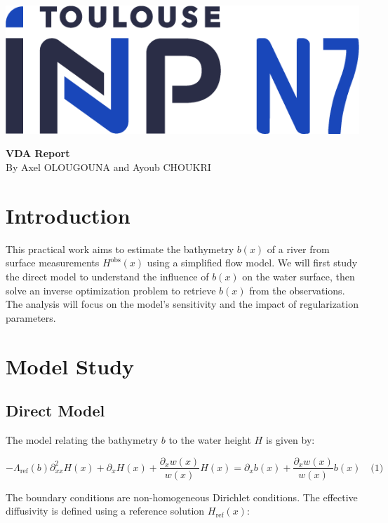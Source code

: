 \documentclass{article}
\begin{document}
\begin{titlepage}
\begin{center}
    \includegraphics[width=0.3\linewidth]{Logo-toulouse-inp-N7.png}
\end{center}
    \centering
    \vspace*{3in} %
    \Huge \textbf{VDA Report} \\[1cm] %
    \Large {By Axel OLOUGOUNA and Ayoub CHOUKRI} \\ %
    \Large \date{March 2025} %
    \vfill
\end{titlepage}

\newpage

\tableofcontents

\newpage

\section{Introduction}

This practical work aims to estimate the bathymetry \( b(x) \) of a river from surface measurements \( H^{\text{obs}}(x) \) using a simplified flow model. We will first study the direct model to understand the influence of \( b(x) \) on the water surface, then solve an inverse optimization problem to retrieve \( b(x) \) from the observations. The analysis will focus on the model's sensitivity and the impact of regularization parameters.

\section{Model Study}

\subsection{Direct Model}
The model relating the bathymetry \( b \) to the water height \( H \) is given by:

\[
-\Lambda_{\text{ref}}(b)\partial^{2}_{xx}H(x) + \partial_{x}H(x) + \frac{\partial_{x}w(x)}{w(x)}H(x) = \partial_{x}b(x) + \frac{\partial_{x}w(x)}{w(x)}b(x)
\quad \text{(1)}
\]

The boundary conditions are non-homogeneous Dirichlet conditions. The effective diffusivity is defined using a reference solution \( H_{\text{ref}}(x) \):
\end{document}
